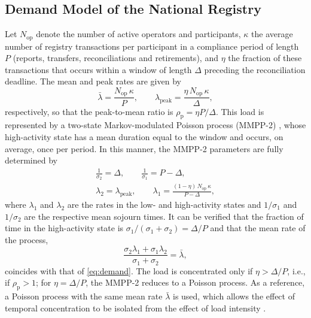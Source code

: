 \documentclass[english]{sbc2025}%
\begin{document}
\subsection{Demand Model of the National Registry}

Let $N_{\mathrm{op}}$ denote the number of active operators and participants, $\kappa$ the average number of registry transactions per participant in a compliance period of length $P$ (reports, transfers, reconciliations and retirements), and $\eta$ the fraction of these transactions that occurs within a window of length $\Delta$ preceding the reconciliation deadline. The mean and peak rates are given by
\begin{equation}
\bar{\lambda} = \frac{N_{\mathrm{op}}\,\kappa}{P}, \qquad \lambda_{\mathrm{peak}} = \frac{\eta\, N_{\mathrm{op}}\,\kappa}{\Delta},
\label{eq:demand}
\end{equation}
respectively, so that the peak-to-mean ratio is $\rho_{\mathrm{p}} = \eta P / \Delta$. This load is represented by a two-state Markov-modulated Poisson process (MMPP-2) \citep{Fischer1993}, whose high-activity state has a mean duration equal to the window and occurs, on average, once per period. In this manner, the MMPP-2 parameters are fully determined by
\begin{gather}
\frac{1}{\sigma_{2}} = \Delta, \qquad \frac{1}{\sigma_{1}} = P - \Delta, \nonumber\\
\lambda_{2} = \lambda_{\mathrm{peak}}, \qquad \lambda_{1} = \frac{(1-\eta)\,N_{\mathrm{op}}\,\kappa}{P - \Delta},
\label{eq:mmpp}
\end{gather}
where $\lambda_{1}$ and $\lambda_{2}$ are the rates in the low- and high-activity states and $1/\sigma_{1}$ and $1/\sigma_{2}$ are the respective mean sojourn times. It can be verified that the fraction of time in the high-activity state is $\sigma_{1}/(\sigma_{1}+\sigma_{2}) = \Delta/P$ and that the mean rate of the process,
\begin{equation}
\frac{\sigma_{2}\lambda_{1} + \sigma_{1}\lambda_{2}}{\sigma_{1} + \sigma_{2}} = \bar{\lambda},
\label{eq:meanrate}
\end{equation}
coincides with that of \eqref{eq:demand}. The load is concentrated only if $\eta > \Delta/P$, i.e., if $\rho_{\mathrm{p}} > 1$; for $\eta = \Delta/P$, the MMPP-2 reduces to a Poisson process. As a reference, a Poisson process with the same mean rate $\bar{\lambda}$ is used, which allows the effect of temporal concentration to be isolated from the effect of load intensity \citep{Paxson1995}.
\end{document}
